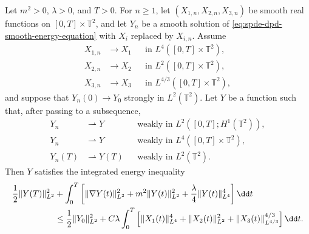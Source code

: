 \begin{proposition}
\label{prop:spde-dpd-energy-closed-under-approximation}
Let \(m^2>0\), \(\lambda>0\), and \(T>0\).  For \(n\geq1\), let
\((X_{1,n},X_{2,n},X_{3,n})\) be smooth real functions on
\([0,T]\times\mathbb T^2\), and let \(Y_n\) be a smooth solution of
\eqref{eq:spde-dpd-smooth-energy-equation} with \(X_i\) replaced by
\(X_{i,n}\).  Assume
\[
\begin{aligned}
  X_{1,n}&\to X_1
    &&\text{in }L^4([0,T]\times\mathbb T^2),\\
  X_{2,n}&\to X_2
    &&\text{in }L^2([0,T]\times\mathbb T^2),\\
  X_{3,n}&\to X_3
    &&\text{in }L^{4/3}([0,T]\times\mathbb T^2),
\end{aligned}
\]
and suppose that \(Y_n(0)\to Y_0\) strongly in \(L^2(\mathbb T^2)\).  Let
\(Y\) be a function such that, after passing to a subsequence,
\[
\begin{aligned}
  Y_n&\rightharpoonup Y
    &&\text{weakly in }L^2([0,T];H^1(\mathbb T^2)),\\
  Y_n&\rightharpoonup Y
    &&\text{weakly in }L^4([0,T]\times\mathbb T^2),\\
  Y_n(T)&\rightharpoonup Y(T)
    &&\text{weakly in }L^2(\mathbb T^2).
\end{aligned}
\]
Then \(Y\) satisfies the integrated energy inequality
\begin{align}
  \frac12\|Y(T)\|_{L^2}^2
  &+
  \int_0^T
  \left[
    \|\nabla Y(t)\|_{L^2}^2
    +m^2\|Y(t)\|_{L^2}^2
    +\frac{\lambda}{4}\|Y(t)\|_{L^4}^4
  \right]\dd t
  \notag\\
  &\leq
  \frac12\|Y_0\|_{L^2}^2
  +
  C\lambda
  \int_0^T
  \left[
    \|X_1(t)\|_{L^4}^4
    +\|X_2(t)\|_{L^2}^2
    +\|X_3(t)\|_{L^{4/3}}^{4/3}
  \right]\dd t .
  \label{eq:spde-dpd-closed-energy-inequality}
\end{align}
\end{proposition}

